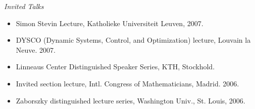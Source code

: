 \emph{Invited Talks}

\begin{itemize}
\item Simon Stevin Lecture, Katholieke Universiteit Leuven, 2007.
\item DYSCO (Dynamic Systems, Control, and Optimization) lecture, Louvain la Neuve. 2007.
\item Linneaus Center Distinguished Speaker Series, KTH, Stockhold. 
\item Invited section lecture, Intl. Congress of Mathematicians, Madrid. 2006.
\item Zaborszky distinguished lecture series, Washington Univ., St. Louis, 2006.
\end{itemize}

